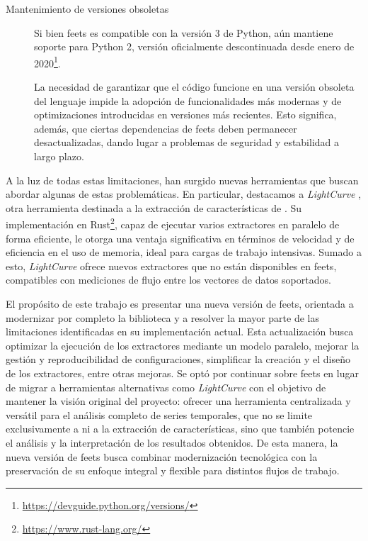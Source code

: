 \begin{description}
    \item[Mantenimiento de versiones obsoletas]
    Si bien \gls{feets} es compatible con la versión 3 de Python, aún mantiene soporte para Python 2, versión oficialmente descontinuada desde enero de 2020\footnote{\url{https://devguide.python.org/versions/}}.
    
    La necesidad de garantizar que el código funcione en una versión obsoleta del lenguaje impide la adopción de funcionalidades más modernas y de optimizaciones introducidas en versiones más recientes. Esto significa, además, que ciertas dependencias de \gls{feets} deben permanecer desactualizadas, dando lugar a problemas de seguridad y estabilidad a largo plazo.
\end{description}

A la luz de todas estas limitaciones, han surgido nuevas herramientas que buscan abordar algunas de  estas problemáticas. En particular, destacamos a \emph{LightCurve} \citep{malanchev2021lightcurve}, otra herramienta destinada a la extracción de características de . Su implementación en Rust\footnote{\url{https://www.rust-lang.org/}}, capaz de ejecutar varios extractores en paralelo de forma eficiente, le otorga una ventaja significativa en términos de velocidad y de eficiencia en el uso de memoria, ideal para cargas de trabajo intensivas. Sumado a esto, \emph{LightCurve} ofrece nuevos extractores que no están disponibles en \gls{feets}, compatibles con mediciones de flujo entre los vectores de datos soportados.


El propósito de este trabajo es presentar una nueva versión de \gls{feets}, orientada a modernizar por completo la biblioteca y a resolver la mayor parte de las limitaciones identificadas en su implementación actual. Esta actualización busca optimizar la ejecución de los extractores mediante un modelo paralelo, mejorar la gestión y reproducibilidad de configuraciones, simplificar la creación y el diseño de los extractores, entre otras mejoras. Se optó por continuar sobre \gls{feets} en lugar de migrar a herramientas alternativas como \emph{LightCurve} con el objetivo de mantener la visión original del proyecto: ofrecer una herramienta centralizada y versátil para el análisis completo de series temporales, que no se limite exclusivamente a  ni a la extracción de características, sino que también potencie el análisis y la interpretación de los resultados obtenidos. De esta manera, la nueva versión de \gls{feets} busca combinar modernización tecnológica con la preservación de su enfoque integral y flexible para distintos flujos de trabajo.
